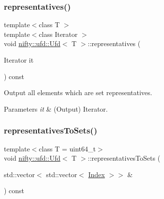 \subsubsection{\texorpdfstring{representatives()}{representatives()}}
{\footnotesize\ttfamily template$<$class T $>$ \\
template$<$class Iterator $>$ \\
void \hyperlink{classnifty_1_1ufd_1_1Ufd}{nifty\+::ufd\+::\+Ufd}$<$ T $>$\+::representatives (\begin{DoxyParamCaption}\item[{Iterator}]{it }\end{DoxyParamCaption}) const\hspace{0.3cm}{\ttfamily [inline]}}

Output all elements which are set representatives.


\begin{DoxyParams}{Parameters}
{\em it} & (Output) Iterator. \\
\hline
\end{DoxyParams}
\mbox{\label{classnifty_1_1ufd_1_1Ufd_a775039106582ee5f0a13c3fbd9099aa8}} 
\subsubsection{\texorpdfstring{representatives\+To\+Sets()}{representativesToSets()}}
{\footnotesize\ttfamily template$<$class T = uint64\+\_\+t$>$ \\
void \hyperlink{classnifty_1_1ufd_1_1Ufd}{nifty\+::ufd\+::\+Ufd}$<$ T $>$\+::representatives\+To\+Sets (\begin{DoxyParamCaption}\item[{std\+::vector$<$ std\+::vector$<$ \hyperlink{classnifty_1_1ufd_1_1Ufd_a0a9a7ab02b6d77fb2035234cbda8b3a7}{Index} $>$$>$ \&}]{ }\end{DoxyParamCaption}) const\hspace{0.3cm}{\ttfamily [inline]}}

\mbox{\label{classnifty_1_1ufd_1_1Ufd_ab88f28136d563c4605960bf9aef2d86f}} 

